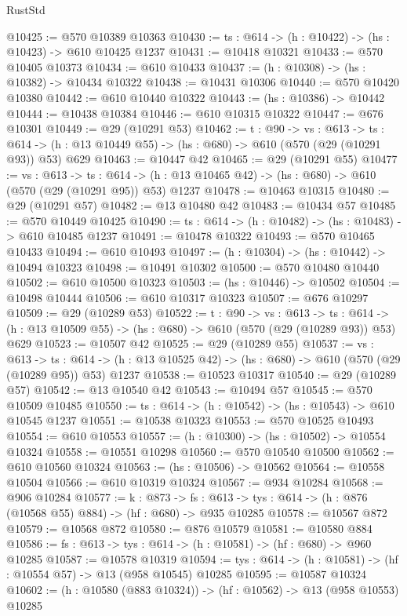 \begin{lexlean}{RustStd}
\begin{coremodule}
@10425 := @570 @10389 @10363
@10430 := {ts : @614} -> (h : @10422) -> (hs : @10423) -> @610 @10425 @1237
@10431 := @10418 @10321
@10433 := @570 @10405 @10373
@10434 := @610 @10433
@10437 := (h : @10308) -> (hs : @10382) -> @10434 @10322
@10438 := @10431 @10306
@10440 := @570 @10420 @10380
@10442 := @610 @10440 @10322
@10443 := (hs : @10386) -> @10442
@10444 := @10438 @10384
@10446 := @610 @10315 @10322
@10447 := @676 @10301
@10449 := @29 (@10291 @53)
@10462 := {t : @90} ->
  {vs : @613} ->
  {ts : @614} -> (h : @13 @10449 @55) -> (hs : @680) -> @610 (@570 (@29 (@10291 @93)) @53) @629
@10463 := @10447 @42
@10465 := @29 (@10291 @55)
@10477 := {vs : @613} ->
  {ts : @614} -> (h : @13 @10465 @42) -> (hs : @680) -> @610 (@570 (@29 (@10291 @95)) @53) @1237
@10478 := @10463 @10315
@10480 := @29 (@10291 @57)
@10482 := @13 @10480 @42
@10483 := @10434 @57
@10485 := @570 @10449 @10425
@10490 := {ts : @614} -> (h : @10482) -> (hs : @10483) -> @610 @10485 @1237
@10491 := @10478 @10322
@10493 := @570 @10465 @10433
@10494 := @610 @10493
@10497 := (h : @10304) -> (hs : @10442) -> @10494 @10323
@10498 := @10491 @10302
@10500 := @570 @10480 @10440
@10502 := @610 @10500 @10323
@10503 := (hs : @10446) -> @10502
@10504 := @10498 @10444
@10506 := @610 @10317 @10323
@10507 := @676 @10297
@10509 := @29 (@10289 @53)
@10522 := {t : @90} ->
  {vs : @613} ->
  {ts : @614} -> (h : @13 @10509 @55) -> (hs : @680) -> @610 (@570 (@29 (@10289 @93)) @53) @629
@10523 := @10507 @42
@10525 := @29 (@10289 @55)
@10537 := {vs : @613} ->
  {ts : @614} -> (h : @13 @10525 @42) -> (hs : @680) -> @610 (@570 (@29 (@10289 @95)) @53) @1237
@10538 := @10523 @10317
@10540 := @29 (@10289 @57)
@10542 := @13 @10540 @42
@10543 := @10494 @57
@10545 := @570 @10509 @10485
@10550 := {ts : @614} -> (h : @10542) -> (hs : @10543) -> @610 @10545 @1237
@10551 := @10538 @10323
@10553 := @570 @10525 @10493
@10554 := @610 @10553
@10557 := (h : @10300) -> (hs : @10502) -> @10554 @10324
@10558 := @10551 @10298
@10560 := @570 @10540 @10500
@10562 := @610 @10560 @10324
@10563 := (hs : @10506) -> @10562
@10564 := @10558 @10504
@10566 := @610 @10319 @10324
@10567 := @934 @10284
@10568 := @906 @10284
@10577 := {k : @873} ->
  {fs : @613} -> {tys : @614} -> (h : @876 (@10568 @55) @884) -> (hf : @680) -> @935 @10285
@10578 := @10567 @872
@10579 := @10568 @872
@10580 := @876 @10579
@10581 := @10580 @884
@10586 := {fs : @613} -> {tys : @614} -> (h : @10581) -> (hf : @680) -> @960 @10285
@10587 := @10578 @10319
@10594 := {tys : @614} -> (h : @10581) -> (hf : @10554 @57) -> @13 (@958 @10545) @10285
@10595 := @10587 @10324
@10602 := (h : @10580 (@883 @10324)) -> (hf : @10562) -> @13 (@958 @10553) @10285

\end{coremodule}
\end{lexlean}
